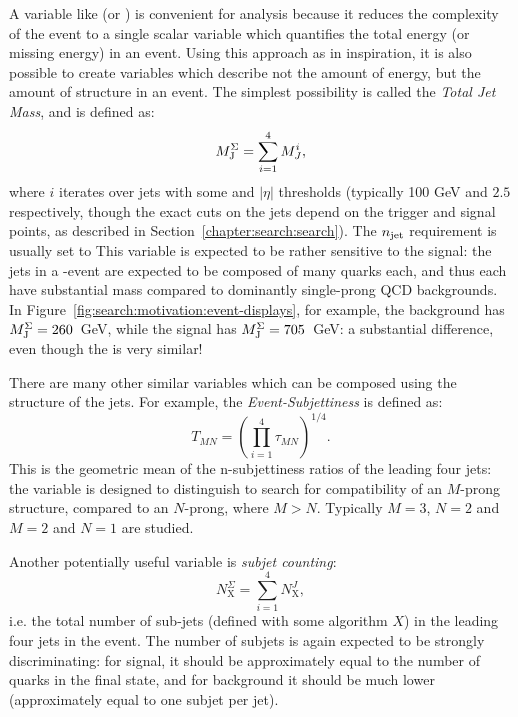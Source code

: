 A variable like \Ht (or \met) is convenient for analysis because it reduces the complexity of the event to a single scalar variable which quantifies the total energy (or missing energy) in an event. Using this approach as in inspiration, it is also possible to create variables which describe not the amount of energy, but the amount of structure in an event.  The simplest possibility is called the \textit{Total Jet Mass}, and is defined as:
%
\begin{equation}
M_{\textrm{J}}^{\Sigma} = \sum_{i=1}^4 M_J^i,
\end{equation}
%
where $i$ iterates over jets with some \pt and $|\eta|$ thresholds (typically 100 GeV and $2.5$ respectively, though the exact \pt cuts on the jets depend on the trigger and signal points, as described in Section~\ref{chapter:search:search}). The $n_{\rm jet}$ requirement is usually set to  This variable is expected to be rather sensitive to the signal: the \largeR jets in a \gl-\gl event are expected to be composed of many quarks each, and thus each have substantial mass compared to dominantly single-prong QCD backgrounds. In Figure~\ref{fig:search:motivation:event-displays}, for example, the background has $M_{\textrm{J}}^{\Sigma} = 260$~GeV, while the signal has $M_{\textrm{J}}^{\Sigma} = 705$~GeV: a substantial difference, even though the \HT is very similar!

There are many other similar variables which can be composed using the structure of the \largeR jets. For example, the \textit{Event-Subjettiness} is defined as:
%
\begin{equation}
T_{MN} = \left(\prod_{i=1}^4 \tau_{MN}\right)^{1/4}.
\end{equation}
%
This is the geometric mean of the n-subjettiness ratios of the leading four jets: the variable is designed to distinguish to search for compatibility of an $M$-prong structure, compared to an $N$-prong, where $M>N$. Typically $M=3$, $N=2$ and $M=2$ and $N=1$ are studied.

Another potentially useful variable is \textit{subjet counting}:
%
\begin{equation}
N_\mathrm{X}^\Sigma = \sum_{i=1}^4 N_\mathrm{X}^J,
\end{equation}
%
i.e. the total number of sub-jets (defined with some algorithm $X$) in the leading four jets in the event. The number of subjets is again expected to be strongly discriminating: for signal, it should be approximately equal to the number of quarks in the final state, and for background it should be much lower (approximately equal to one subjet per jet). 



